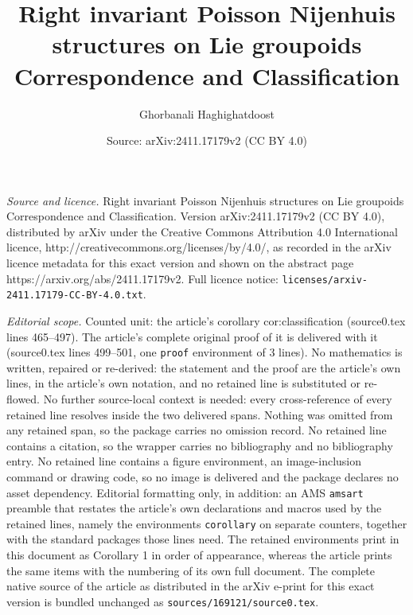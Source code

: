 \documentclass[10pt,a4paper]{amsart}
\title{Right invariant Poisson Nijenhuis structures on Lie groupoids Correspondence and Classification}
\author{Ghorbanali Haghighatdoost}
\date{Source: arXiv:2411.17179v2 (CC BY 4.0)}
\begin{document}
\maketitle

\noindent\emph{Source and licence.} Right invariant Poisson Nijenhuis structures on Lie groupoids Correspondence and Classification. Version arXiv:2411.17179v2 (CC BY 4.0), distributed by arXiv under the Creative Commons Attribution 4.0 International licence, http://creativecommons.org/licenses/by/4.0/, as recorded in the arXiv licence metadata for this exact version and shown on the abstract page https://arxiv.org/abs/2411.17179v2. Full licence notice: \texttt{licenses/arxiv-2411.17179-CC-BY-4.0.txt}.\par\smallskip

\noindent\textit{Editorial scope.} Counted unit: the article's corollary cor:classification (source0.tex lines 465--497). The article's complete original proof of it is delivered with it (source0.tex lines 499--501, one \texttt{proof} environment of 3 lines). No mathematics is written, repaired or re-derived: the statement and the proof are the article's own lines, in the article's own notation, and no retained line is substituted or re-flowed.  No further source-local context is needed: every cross-reference of every retained line resolves inside the two delivered spans.  Nothing was omitted from any retained span, so the package carries no omission record.  No retained line contains a citation, so the wrapper carries no bibliography and no bibliography entry.  No retained line contains a figure environment, an image-inclusion command or drawing code, so no image is delivered and the package declares no asset dependency.  Editorial formatting only, in addition: an AMS \texttt{amsart} preamble that restates the article's own declarations and macros used by the retained lines, namely the environments \texttt{corollary} on separate counters, together with the standard packages those lines need.  The retained environments print in this document as Corollary 1 in order of appearance, whereas the article prints the same items with the numbering of its own full document.  The complete native source of the article as distributed in the arXiv e-print for this exact version is bundled unchanged as \texttt{sources/169121/source0.tex}.
\end{document}
